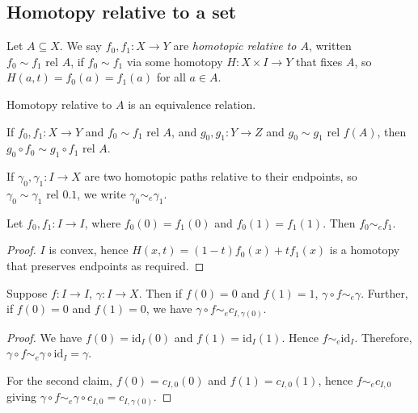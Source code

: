 \subsection{Homotopy relative to a set}
\begin{definition}
	Let \( A \subseteq X \).
	We say \( f_0, f_1 \colon X \to Y \) are \emph{homotopic relative to \( A \)}, written \( f_0 \sim f_1 \text{ rel } A \), if \( f_0 \sim f_1 \) via some homotopy \( H \colon X \times I \to Y \) that fixes \( A \), so \( H(a,t) = f_0(a) = f_1(a) \) for all \( a \in A \).
\end{definition}
\begin{lemma}
	Homotopy relative to \( A \) is an equivalence relation.
\end{lemma}
\begin{lemma}
	If \( f_0, f_1 \colon X \to Y \) and \( f_0 \sim f_1 \text{ rel } A \), and \( g_0, g_1 \colon Y \to Z \) and \( g_0 \sim g_1 \text{ rel } f(A) \), then \( g_0 \circ f_0 \sim g_1 \circ f_1 \text{ rel } A \).
\end{lemma}
If \( \gamma_0, \gamma_1 \colon I \to X \) are two homotopic paths relative to their endpoints, so \( \gamma_0 \sim \gamma_1 \text{ rel } \qty{0,1} \), we write \( \gamma_0 \sim_e \gamma_1 \).
\begin{lemma}
	Let \( f_0, f_1 \colon I \to I \), where \( f_0(0) = f_1(0) \) and \( f_0(1) = f_1(1) \).
	Then \( f_0 \sim_e f_1 \).
\end{lemma}
\begin{proof}
	\( I \) is convex, hence \( H(x,t) = (1-t)f_0(x) + tf_1(x) \) is a homotopy that preserves endpoints as required.
\end{proof}
\begin{corollary}
	Suppose \( f \colon I \to I \), \( \gamma \colon I \to X \).
	Then if \( f(0) = 0 \) and \( f(1) = 1 \), \( \gamma \circ f \sim_e \gamma \).
	Further, if \( f(0) = 0 \) and \( f(1) = 0 \), we have \( \gamma \circ f \sim_e c_{I,\gamma(0)} \).
\end{corollary}
\begin{proof}
	We have \( f(0) = \mathrm{id}_I(0) \) and \( f(1) = \mathrm{id}_I(1) \).
	Hence \( f \sim_e \mathrm{id}_I \).
	Therefore, \( \gamma \circ f \sim_e \gamma \circ \mathrm{id}_I = \gamma \).

	For the second claim, \( f(0) = c_{I,0}(0) \) and \( f(1) = c_{I,0}(1) \), hence \( f \sim_e c_{I,0} \) giving \( \gamma \circ f \sim_e \gamma \circ c_{I,0} = c_{I,\gamma(0)} \).
\end{proof}
